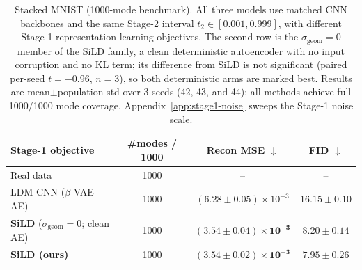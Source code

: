 \begin{table}[t]
\centering
\caption{%
Stacked MNIST (1000-mode benchmark). All three models use matched CNN backbones and the same Stage-2 interval $t_2\in[0.001,0.999]$, with different Stage-1 representation-learning objectives. The second row is the $\sigma_{\mathrm{geom}}\!=\!0$ member of the SiLD family, a clean deterministic autoencoder with no input corruption and no KL term; its difference from SiLD is not significant (paired per-seed $t=-0.96$, $n=3$), so both deterministic arms are marked best. Results are mean$\pm$population std over 3 seeds (42, 43, and 44); all methods achieve full 1000/1000 mode coverage. Appendix~\ref{app:stage1-noise} sweeps the Stage-1 noise scale.%
}
\small
\begin{tabular}{lccc}
\toprule
Stage-1 objective & \#modes / 1000 & Recon MSE $\downarrow$ & FID $\downarrow$ \\
\midrule
Real data           & 1000 & --                                & --                       \\
\midrule
LDM-CNN ($\beta$-VAE AE) & 1000 & $(6.28 \pm 0.05)\!\times\!10^{-3}$ & $16.15 \pm 0.10$ \\
\textbf{SiLD} ($\sigma_{\mathrm{geom}}\!=\!0$; clean AE) & 1000 & $\mathbf{(3.54 \pm 0.04)\!\times\!10^{-3}}$ & $\mathbf{8.20 \pm 0.14}$ \\
\textbf{SiLD (ours)}     &  {1000} & $\mathbf{(3.54 \pm 0.02)\!\times\!10^{-3}}$ & $\mathbf{7.95 \pm 0.26}$ \\
\bottomrule
\end{tabular}
\label{tab:stacked_mnist}
\end{table}





